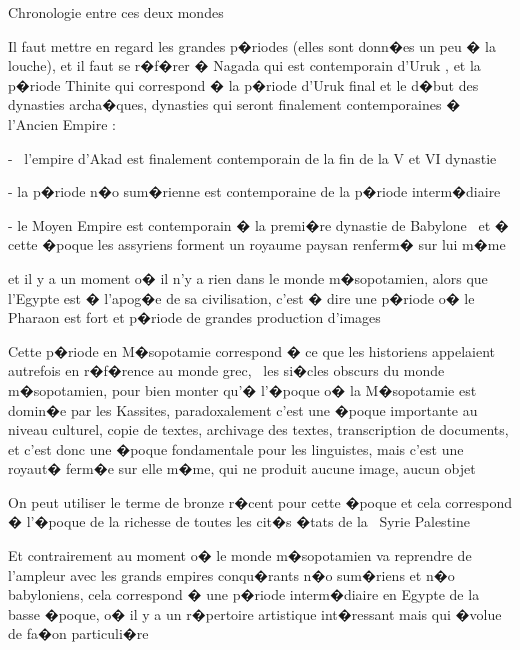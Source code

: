 \documentclass{article}
\begin{document}
\bigskip


\bigskip


\bigskip


\bigskip


\bigskip


\bigskip


\bigskip


\bigskip


\bigskip

Chronologie entre ces deux mondes 


\bigskip

Il faut mettre en regard les grandes p�riodes (elles sont donn�es un peu � la louche), et il faut se r�f�rer � Nagada qui est contemporain d'Uruk , et la p�riode Thinite qui correspond � la p�riode d'Uruk final et le d�but des dynasties archa�ques, dynasties qui seront finalement contemporaines � l'Ancien Empire :

{}- \ l'empire d'Akad est finalement contemporain de la fin de la V et VI dynastie

{}- la p�riode n�o sum�rienne est contemporaine de la p�riode interm�diaire

{}- le Moyen Empire est contemporain � la premi�re dynastie de Babylone \ et � cette �poque les assyriens forment un royaume paysan renferm� sur lui m�me

et il y a un moment o� il n'y a rien dans le monde m�sopotamien, alors que l'Egypte est � l'apog�e de sa civilisation, c'est � dire une p�riode o� le Pharaon est fort et p�riode de grandes production d'images

Cette p�riode en M�sopotamie correspond � ce que les historiens appelaient autrefois en r�f�rence au monde grec, \ les si�cles obscurs du monde m�sopotamien, pour bien monter qu'� l'�poque o� la M�sopotamie est domin�e par les Kassites, paradoxalement c'est une �poque importante au niveau culturel, copie de textes, archivage des textes, transcription de documents, et c'est donc une �poque fondamentale pour les linguistes, mais c'est une royaut� ferm�e sur elle m�me, qui ne produit aucune image, aucun objet


\bigskip

On peut utiliser le terme de bronze r�cent pour cette �poque et cela correspond � l'�poque de la richesse de toutes les cit�s �tats de la \ Syrie Palestine


\bigskip

Et contrairement au moment o� le monde m�sopotamien va reprendre de l'ampleur avec les grands empires conqu�rants n�o sum�riens et n�o babyloniens, cela correspond � une p�riode interm�diaire en Egypte de la basse �poque, o� il y a un r�pertoire artistique int�ressant mais qui �volue de fa�on particuli�re
\end{document}
